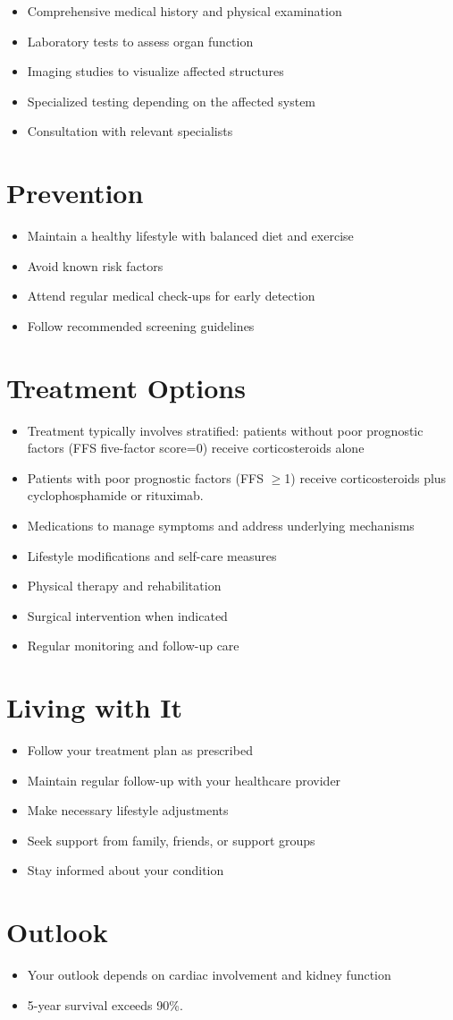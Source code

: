 \begin{itemize}[noitemsep]
  \item Comprehensive medical history and physical examination
  \item Laboratory tests to assess organ function
  \item Imaging studies to visualize affected structures
  \item Specialized testing depending on the affected system
  \item Consultation with relevant specialists
\end{itemize}
\section{Prevention}
\begin{itemize}[noitemsep]
  \item Maintain a healthy lifestyle with balanced diet and exercise
  \item Avoid known risk factors
  \item Attend regular medical check-ups for early detection
  \item Follow recommended screening guidelines
\end{itemize}
\section{Treatment Options}
\begin{itemize}[noitemsep]
  \item Treatment typically involves stratified: patients without poor prognostic factors (FFS five-factor score=0) receive corticosteroids alone
  \item Patients with poor prognostic factors (FFS $\geq$1) receive corticosteroids plus cyclophosphamide or rituximab.
  \item Medications to manage symptoms and address underlying mechanisms
  \item Lifestyle modifications and self-care measures
  \item Physical therapy and rehabilitation
  \item Surgical intervention when indicated
  \item Regular monitoring and follow-up care
\end{itemize}
\section{Living with It}
\begin{itemize}[noitemsep]
  \item Follow your treatment plan as prescribed
  \item Maintain regular follow-up with your healthcare provider
  \item Make necessary lifestyle adjustments
  \item Seek support from family, friends, or support groups
  \item Stay informed about your condition
\end{itemize}
\section{Outlook}
\begin{itemize}[noitemsep]
  \item Your outlook depends on cardiac involvement and kidney function
  \item 5-year survival exceeds 90\%.
\end{itemize}
